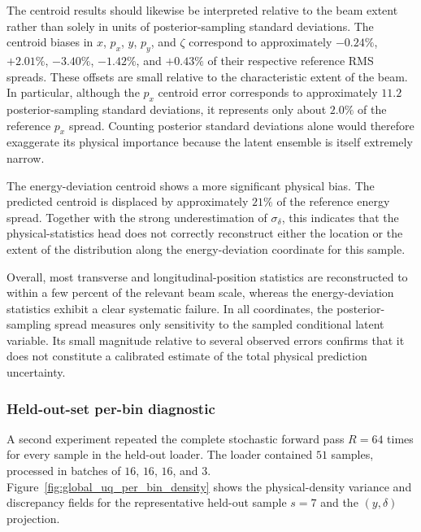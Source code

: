 The centroid results should likewise be interpreted relative to the beam extent rather than solely in units of posterior-sampling standard deviations. The centroid biases in \(x\), \(p_x\), \(y\), \(p_y\), and \(\zeta\) correspond to approximately \(-0.24\%\), \(+2.01\%\), \(-3.40\%\), \(-1.42\%\), and \(+0.43\%\) of their respective reference RMS spreads. These offsets are small relative to the characteristic extent of the beam. In particular, although the \(p_x\) centroid error corresponds to approximately \(11.2\) posterior-sampling standard deviations, it represents only about \(2.0\%\) of the reference \(p_x\) spread. Counting posterior standard deviations alone would therefore exaggerate its physical importance because the latent ensemble is itself extremely narrow.

The energy-deviation centroid shows a more significant physical bias. The predicted centroid is displaced by approximately \(21\%\) of the reference energy spread. Together with the strong underestimation of \(\sigma_{\delta}\), this indicates that the physical-statistics head does not correctly reconstruct either the location or the extent of the distribution along the energy-deviation coordinate for this sample.

Overall, most transverse and longitudinal-position statistics are reconstructed to within a few percent of the relevant beam scale, whereas the energy-deviation statistics exhibit a clear systematic failure. In all coordinates, the posterior-sampling spread measures only sensitivity to the sampled conditional latent variable. Its small magnitude relative to several observed errors confirms that it does not constitute a calibrated estimate of the total physical prediction uncertainty.


\subsubsection{Held-out-set per-bin diagnostic}
\label{subsubsec:uq_dataset_wide_per_bin}

A second experiment repeated the complete stochastic forward pass \(R=64\) times for every sample in the held-out loader. The loader contained \(51\) samples, processed in batches of \(16\), \(16\), \(16\), and \(3\). Figure~\ref {fig:global_uq_per_bin_density} shows the physical-density variance and discrepancy fields for the representative held-out sample \(s=7\) and the \((y,\delta)\) projection.

